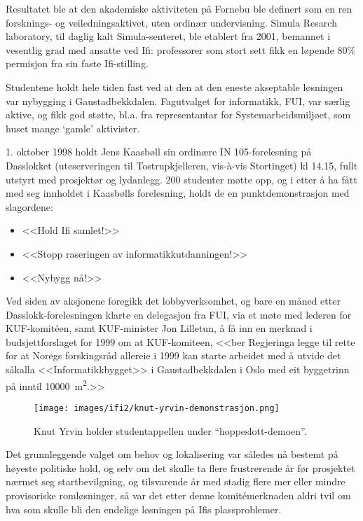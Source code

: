 Resultatet ble at den akademiske aktiviteten på Fornebu ble definert som en ren forsknings- og veiledningsaktivet, uten ordinær undervisning. Simula Resarch laboratory, til daglig kalt Simula-senteret, ble etablert fra 2001, bemannet i vesentlig grad med ansatte ved Ifi: professorer som stort sett fikk en løpende 80\% permisjon fra sin faste Ifi-stilling.

Studentene holdt hele tiden fast ved at den at den eneste akseptable løsningen var nybygging i Gaustadbekkdalen. Fagutvalget for informatikk, FUI, var særlig aktive, og fikk god støtte, bl.a. fra representantar for Systemarbeidsmiljøet, som huset mange `gamle' aktivister.

1. oktober 1998 holdt Jens Kaasbøll sin ordinære IN 105-forelesning på Dasslokket (uteserveringen til Tostrupkjelleren, vis-à-vis Stortinget) kl 14.15, fullt utstyrt med prosjektør og lydanlegg. 200 studenter møtte opp, og i etter å ha fått med seg innholdet i Kaasbølls forelesning, holdt de en punktdemonstrasjon med slagordene:

\begin{itemize}
	\item <<Hold Ifi samlet!>>
	\item <<Stopp raseringen av informatikkutdanningen!>>
	\item <<Nybygg nå!>>
\end{itemize}

Ved siden av aksjonene foregikk det lobbyverksomhet, og bare en måned etter Dasslokk-forelesningen klarte en delegasjon fra FUI, via et møte med lederen for KUF-komitéen, samt KUF-minister Jon Lilletun, å få inn en merknad i budsjettforslaget for 1999 om at KUF-komiteen, <<ber Regjeringa legge til rette for at Noregs forskingsråd allereie i 1999 kan starte arbeidet med å utvide det såkalla <<Informatikkbygget>> i Gaustadbekkdalen i Oslo med eit byggetrinn på inntil \SI{10 000}{\metre\squared}.>>

\begin{wrapfigure}{l}{8cm}
\centering
\texttt{[image: images/ifi2/knut-yrvin-demonstrasjon.png]}
	\caption{Knut Yrvin holder studentappellen under ``hoppeslott-demoen''.}
\end{wrapfigure}

Det grunnleggende valget om behov og lokalisering var således nå bestemt på høyeste politiske hold, og selv om det skulle ta flere frustrerende år før prosjektet nærmet seg startbevilgning, og tilsvarende år med stadig flere mer eller mindre provisoriske romløsninger, så var det etter denne komitémerknaden aldri tvil om hva som skulle bli den endelige løsningen på Ifis plassproblemer.

